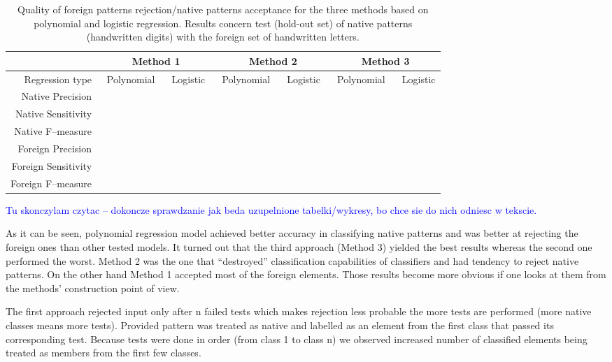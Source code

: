 \documentclass{llncs}
\begin{document}
\begin{table}[!b]
	\vspace{-1pt}
	\centering
	\caption{Quality of foreign patterns rejection/native patterns acceptance for the three methods based on polynomial and logistic regression. Results concern test (hold-out set) of native patterns (handwritten digits) with the foreign set of handwritten letters.}
	\vspace{-6pt}
	\setlength{\tabcolsep}{3pt}
	\renewcommand{\arraystretch}{1}
	{\footnotesize
		\begin{tabular}{|r||c|c||c|c||c|c|}
			\hline
			& \multicolumn{2}{c||}{Method 1} & \multicolumn{2}{c||}{Method 2} & \multicolumn{2}{c|}{Method 3}\\
			\hline
			Regression type & $\;\;$Polynomial$\;\;$ & $\,$Logistic$\;\;$ & $\,$Polynomial$\;\;$ & $\,$Logistic$\;\;$ & $\,$Polynomial$\;\;$ & $\,$Logistic  \\
			\hline
			Native Precision       & &&&&& \\
			Native Sensitivity &&&&&&\\
			Native F--measure &&&&&&\\
			Foreign Precision &&&&&&\\
			Foreign Sensitivity &&&&&&\\
			Foreign F--measure &&&&&&\\			
			\hline			
		\end{tabular}	
	}
	\vspace{-0pt}
	\label{tab:results_rejection_regression}
\end{table}




\textcolor{blue}{Tu skonczylam czytac -- dokoncze sprawdzanie jak beda uzupelnione tabelki/wykresy, bo chce sie do nich odniesc w tekscie.}


As it can be seen, polynomial regression model achieved better accuracy in classifying native patterns and was better at rejecting the foreign ones than other tested models. It turned out that the third approach (Method 3) yielded the best results whereas the second one performed the worst. Method 2 was the one that ``destroyed'' classification capabilities of classifiers and had tendency to reject native patterns. On the other hand Method 1 accepted most of the foreign elements. Those results become more obvious if one looks at them from the methods' construction point of view. 

The first approach rejected input only after n failed tests which makes rejection less probable the more tests are performed (more native classes means more tests). Provided pattern was treated as native and labelled as an element from the first class that passed its corresponding test. Because tests were done in order (from class 1 to class n) we observed increased number of classified elements being treated as members from the first few classes.
\end{document}
